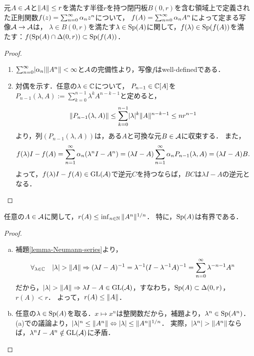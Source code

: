 \documentclass[uplatex,dvipdfmx]{jsreport}
\begin{document}
\begin{lemma}
    元$A\in\mathcal{A}$と$\|A\|\le r$を満たす半径$r$を持つ閉円板$B(0,r)$を含む領域上で定義された正則関数$f(z)=\sum_{n=0}^\infty\alpha_nz^n$について，
    $f(A)=\sum_{n=0}^\infty\alpha_nA^n$によって定まる写像$\mathcal{A}\to\mathcal{A}$は，
    $\lambda\in B(0,r)$を満たす$\lambda\in\mathrm{Sp}(A)$に関して，$f(\lambda)\in\mathrm{Sp}(f(A))$を満たす：$f(\mathrm{Sp}(A)\cap \Delta(0,r))\subset\mathrm{Sp}(f(A))$．
\end{lemma}
\begin{proof}\mbox{}
    \begin{enumerate}
        \item $\sum_{n=0}^\infty\lvert\alpha_n\rvert\|A^n\|<\infty$と$\mathcal{A}$の完備性より，写像$f$はwell-definedである．
        \item 対偶を示す．任意の$\lambda\in\mathbb{C}$について，
        $P_{n-1}\in\mathbb{C}[A]$を$P_{n-1}(\lambda,A):=\sum_{k=0}^{n-1}\lambda^kA^{n-k-1}$と定めると，
        \[\|P_{n-1}(\lambda,A)\|\le\sum^{n-1}_{k=0}\lvert\lambda\rvert^k\|A\|^{n-k-1}\le nr^{n-1}\]
        より，列$(P_{n-1}(\lambda,A))$は，ある$A$と可換な元$B\in\mathcal{A}$に収束する．
        また，
        \[f(\lambda)I-f(A)=\sum^\infty_{n=1}\alpha_n(\lambda^nI-A^n)=(\lambda I-A)\sum^\infty_{n=1}\alpha_nP_{n-1}(\lambda,A)=(\lambda I-A)B.\]
        よって，$f(\lambda)I-f(A)\in\mathrm{GL}(\mathcal{A})$で逆元$C$を持つならば，$BC$は$\lambda I-A$の逆元となる．
    \end{enumerate}
\end{proof}

\begin{lemma}
    任意の$A\in\mathcal{A}$に関して，$r(A)\le\inf_{n\in\mathbb{N}}\|A^n\|^{1/n}$．
    特に，$\mathrm{Sp}(A)$は有界である．
\end{lemma}
\begin{proof}\mbox{}
    \begin{enumerate}[(a)]
        \item 補題\ref{lemma-Neumann-series}より，
        \[\forall_{\lambda\in\mathbb{C}}\quad\lvert\lambda\rvert>\|A\|\Rightarrow(\lambda I-A)^{-1}=\lambda^{-1}(I-\lambda^{-1}A)^{-1}=\sum^\infty_{n=0}\lambda^{-n-1}A^n\]
        だから，$\lvert\lambda\rvert>\|A\|\Rightarrow\lambda I-A\in\mathrm{GL}(\mathcal{A})$，すなわち，$\mathrm{Sp}(A)\subset\Delta(0,r)$，$r(A)<r$．
        よって，$r(A)\le\|A\|$．
        \item 任意の$\lambda\in\mathrm{Sp}(A)$を取る．$x\mapsto x^n$は整関数だから，補題より，$\lambda^n\in\mathrm{Sp}(A^n)$．(a)での議論より，$\lvert\lambda\rvert^n\le\|A^n\|\Leftrightarrow\lvert\lambda\rvert\le\|A^n\|^{1/n}$．
        実際，$\lvert\lambda^n\rvert>\|A^n\|$ならば，$\lambda^nI-A^n\notin\mathrm{GL}(\mathcal{A})$に矛盾．
    \end{enumerate}
\end{proof}
\end{document}
